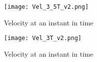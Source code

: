 \begin{figure}[h]
\begin{center}
\texttt{[image: Vel\_3\_5T\_v2.png]}
\caption{Velocity at an instant in time}
\label{velsnearpeak}
\end{center}
\end{figure}

\begin{figure}[h]
\begin{center}
\texttt{[image: Vel\_3T\_v2.png]}
\caption{Velocity at an instant in time}
\label{velsnearzero}
\end{center}
\end{figure}


\endinput

